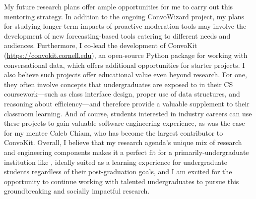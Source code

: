 \documentclass[12pt,letterpaper]{article}
\begin{document}
My future research plans offer ample opportunities for me to carry out this mentoring strategy.
In addition to the ongoing ConvoWizard project, my plans for studying longer-term impacts of proactive moderation tools may involve the development of new forecasting-based tools catering to different needs and audiences.
Furthermore, I co-lead the development of ConvoKit (\url{https://convokit.cornell.edu}), an open-source Python package for working with conversational data, which offers additional opportunities for starter projects.
I also believe such projects offer educational value even beyond research.
For one, they often involve concepts that undergraduates are exposed to in their CS coursework---such as class interface design, proper use of data structures, and reasoning about efficiency---and therefore provide a valuable supplement to their classroom learning.
And of course, students interested in industry careers can use these projects to gain valuable software engineering experience, as was the case for my mentee Caleb Chiam, who has become the largest contributor to ConvoKit.
Overall, I believe that my research agenda's unique mix of research and engineering components makes it
\ifliberalarts
a perfect fit for a primarily-undergraduate institution like \schoolname,
\else
ideally suited as a learning experience for undergraduate students regardless of their post-graduation goals,
\fi
and I am excited for the opportunity to continue working with talented undergraduates to pursue this groundbreaking and socially impactful research.

\vspace{0.5\baselineskip}
\printbibliography
\end{document}
